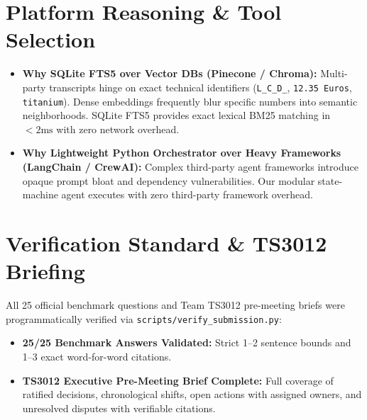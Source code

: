 \documentclass[11pt,a4paper]{article}
\begin{document}
\section{Platform Reasoning \& Tool Selection}
\begin{itemize}
    \item \textbf{Why SQLite FTS5 over Vector DBs (Pinecone / Chroma):} Multi-party transcripts hinge on exact technical identifiers (\texttt{L\_C\_D\_}, \texttt{12.35 Euros}, \texttt{titanium}). Dense embeddings frequently blur specific numbers into semantic neighborhoods. SQLite FTS5 provides exact lexical BM25 matching in $<2\text{ms}$ with zero network overhead.
    \item \textbf{Why Lightweight Python Orchestrator over Heavy Frameworks (LangChain / CrewAI):} Complex third-party agent frameworks introduce opaque prompt bloat and dependency vulnerabilities. Our modular state-machine agent executes with zero third-party framework overhead.
\end{itemize}

\section{Verification Standard \& TS3012 Briefing}
All 25 official benchmark questions and Team TS3012 pre-meeting briefs were programmatically verified via \texttt{scripts/verify\_submission.py}:
\begin{itemize}
    \item \textbf{25/25 Benchmark Answers Validated:} Strict 1--2 sentence bounds and 1--3 exact word-for-word citations.
    \item \textbf{TS3012 Executive Pre-Meeting Brief Complete:} Full coverage of ratified decisions, chronological shifts, open actions with assigned owners, and unresolved disputes with verifiable citations.
\end{itemize}
\end{document}
